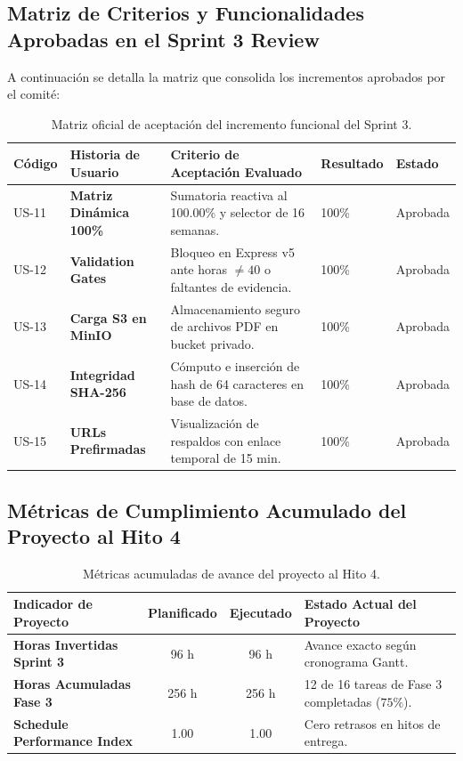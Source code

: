 \documentclass[12pt,a4paper]{article}
\begin{document}
\subsection{Matriz de Criterios y Funcionalidades Aprobadas en el Sprint 3 Review}
A continuación se detalla la matriz que consolida los incrementos aprobados por el comité:
\begin{table}[H]
\centering
\small
\renewcommand{\arraystretch}{1.2}
\begin{tabularx}{\textwidth}{|>{\hsize=0.3\hsize\centering\arraybackslash\footnotesize}X|>{\hsize=1.0\hsize\raggedright\arraybackslash\bfseries\footnotesize}X|>{\hsize=1.8\hsize\raggedright\arraybackslash\footnotesize}X|>{\hsize=0.45\hsize\centering\arraybackslash\footnotesize}X|>{\hsize=0.45\hsize\centering\arraybackslash\footnotesize}X|}
\hline
\rowcolor{tableheader}
\textbf{Código} & \textbf{Historia de Usuario} & \textbf{Criterio de Aceptación Evaluado} & \textbf{Resultado} & \textbf{Estado} \\
\hline
US-11 & Matriz Dinámica 100\% & Sumatoria reactiva al 100.00\% y selector de 16 semanas. & 100\% & Aprobada \\
\hline
US-12 & Validation Gates & Bloqueo en Express v5 ante horas $\ne 40$ o faltantes de evidencia. & 100\% & Aprobada \\
\hline
US-13 & Carga S3 en MinIO & Almacenamiento seguro de archivos PDF en bucket privado. & 100\% & Aprobada \\
\hline
US-14 & Integridad SHA-256 & Cómputo e inserción de hash de 64 caracteres en base de datos. & 100\% & Aprobada \\
\hline
US-15 & URLs Prefirmadas & Visualización de respaldos con enlace temporal de 15 min. & 100\% & Aprobada \\
\hline
\end{tabularx}
\caption{Matriz oficial de aceptación del incremento funcional del Sprint 3.}
\label{tab:sprint3_matrix}
\end{table}

\subsection{Métricas de Cumplimiento Acumulado del Proyecto al Hito 4}
\begin{table}[H]
\centering
\small
\renewcommand{\arraystretch}{1.2}
\begin{tabularx}{\textwidth}{|>{\bfseries}m{3.8cm}|c|c|X|}
\hline
\rowcolor{tableheader}
\textbf{Indicador de Proyecto} & \textbf{Planificado} & \textbf{Ejecutado} & \textbf{Estado Actual del Proyecto} \\
\hline
Horas Invertidas Sprint 3 & 96 h & 96 h & Avance exacto según cronograma Gantt. \\
\hline
Horas Acumuladas Fase 3 & 256 h & 256 h & 12 de 16 tareas de Fase 3 completadas ($75\%$). \\
\hline
Schedule Performance Index & 1.00 & 1.00 & Cero retrasos en hitos de entrega. \\
\hline
\end{tabularx}
\caption{Métricas acumuladas de avance del proyecto al Hito 4.}
\end{table}
\end{document}

